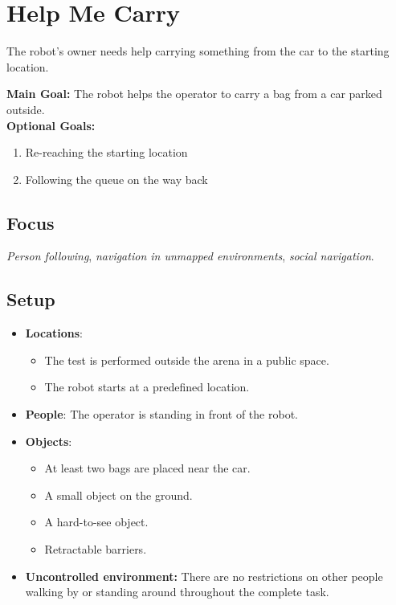 \section{Help Me Carry}
\label{test:carry-my-luggage}
The robot's owner needs help carrying something from the car to the starting location.

\noindent \textbf{Main Goal:} The robot helps the operator to carry a bag from a car parked outside.\\

\noindent \textbf{Optional Goals:}
\begin{enumerate}[nosep]
	\item Re-reaching the starting location
	\item Following the queue on the way back
\end{enumerate}

\subsection*{Focus}
\emph{Person following}, \emph{navigation in unmapped environments}, \emph{social navigation}.

\subsection*{Setup}
\begin{itemize}[nosep]
	\item \textbf{Locations}: 
		\begin{itemize}
		 \item The test is performed outside the arena in a public space.
		 \item The robot starts at a predefined location.
		\end{itemize}
	\item \textbf{People}: The operator is standing in front of the robot.
	\item \textbf{Objects}: 
		\begin{itemize}[nosep]
			\item At least two bags are placed near the car.
			\item A small object on the ground.
			\item A hard-to-see object.
			\item Retractable barriers.
		\end{itemize}
	
	\item \textbf{Uncontrolled environment:} There are no restrictions on other people walking by or standing around throughout the complete task.
\end{itemize}

